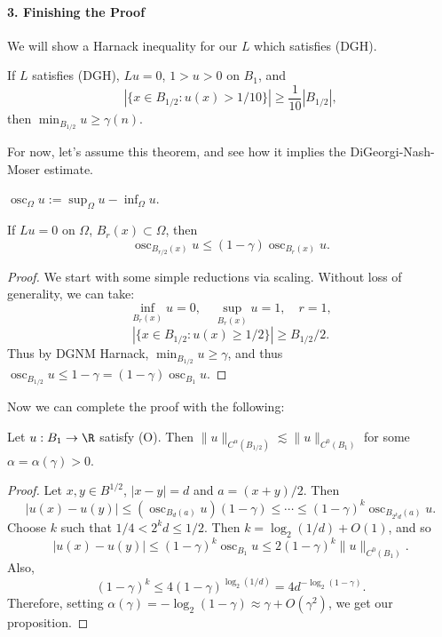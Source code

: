 \paragraph{3. Finishing the Proof}
We will show a Harnack inequality for our $L$ which satisfies (DGH).
\begin{theorem}
If $L$ satisfies (DGH), $Lu=0$, $1>u>0$ on $B_1$, and
\[|\{x\in B_{1/2}:u(x)>1/10\}|\geq\frac1{10}|B_{1/2}|,\tag{P}\]
then $\min_{B_{1/2}}u\geq\gamma(n)$.
\end{theorem}
For now, let's assume this theorem, and see how it implies the DiGeorgi-Nash-Moser estimate.
\begin{definition}[3.1]
$\operatorname{osc}_\Omega u:=\sup_\Omega u-\inf_\Omega u$.
\end{definition}
\begin{corollary}[3.1]
If $Lu=0$ on $\Omega$, $B_r(x)\subset\Omega$, then
\[\operatorname{osc}_{B_{r/2}(x)}u\leq(1-\gamma)\operatorname{osc}_{B_r(x)}u.\tag{O}\]
\end{corollary}
\begin{proof}
We start with some simple reductions via scaling. Without loss of generality, we can take:
\[\inf_{B_r(x)}u=0,\quad\sup_{B_r(x)}u=1,\quad r=1,\]
\[|\{x\in B_{1/2}:u(x)\geq1/2\}|\geq B_{1/2}/2.\]
Thus by DGNM Harnack, $\min_{B_{1/2}}u\geq\gamma$, and thus $\operatorname{osc}_{B_{1/2}}u\leq1-\gamma=(1-\gamma)\operatorname{osc}_{B_1}u$.
\end{proof}
Now we can complete the proof with the following:
\begin{proposition}[3.1]
Let $u:B_1\to\R$ satisfy (O). Then $\|u\|_{C^\alpha(B_{1/2})}\lesssim\|u\|_{C^0(B_1)}$ for some $\alpha=\alpha(\gamma)>0$.
\end{proposition}
\begin{proof}
Let $x,y\in B^{1/2}$, $|x-y|=d$ and $a=(x+y)/2$. Then
\[|u(x)-u(y)|\leq(\operatorname{osc}_{B_d(a)}u)(1-\gamma)\leq\cdots\leq(1-\gamma)^k\operatorname{osc}_{B_{2^kd}(a)}u.\]
Choose $k$ such that $1/4<2^kd\leq1/2$. Then $k=\log_2(1/d)+O(1)$, and so
\[|u(x)-u(y)|\leq(1-\gamma)^k\operatorname{osc}_{B_1}u\leq2(1-\gamma)^k\|u\|_{C^0(B_1)}.\]
Also,
\[(1-\gamma)^k\leq4(1-\gamma)^{\log_2(1/d)}=4d^{-\log_2(1-\gamma)}.\]
Therefore, setting $\alpha(\gamma)=-\log_2(1-\gamma)\approx\gamma+O(\gamma^2)$, we get our proposition.
\end{proof}
